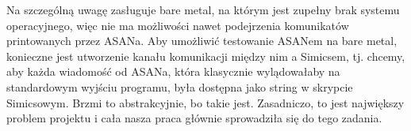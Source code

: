\documentclass[../main.tex]{subfiles}
\begin{document}
Na szczególną uwagę zasługuje bare metal, na którym jest zupełny brak systemu
operacyjnego, więc nie ma możliwości nawet podejrzenia komunikatów printowanych
przez ASANa. Aby umożliwić testowanie ASANem na bare metal, konieczne jest
utworzenie kanału komunikacji między nim a Simicsem, tj. chcemy, aby każda
wiadomość od ASANa, która klasycznie wylądowałaby na standardowym wyjściu
programu, była dostępna jako string w skrypcie Simicsowym. Brzmi to
abstrakcyjnie, bo takie jest. Zasadniczo, to jest największy problem projektu i
cała nasza praca głównie sprowadziła się do tego zadania.
\end{document}
